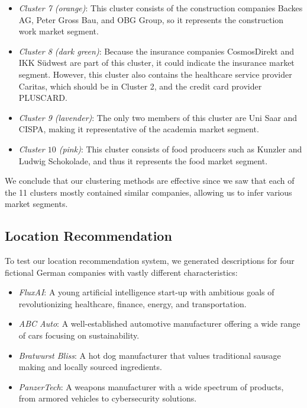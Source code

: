\documentclass[conference]{IEEEtran}
\begin{document}
\begin{itemize}
	\item \textit{Cluster 7 (orange)}: This cluster consists of the construction companies Backes AG, Peter Gross Bau, and OBG Group, so it represents the construction work market segment.
	
	\item \textit{Cluster 8 (dark green)}: Because the insurance companies CosmosDirekt and IKK Südwest are part of this cluster, it could indicate the insurance market segment. However, this cluster also contains the healthcare service provider Caritas, which should be in Cluster 2, and the credit card provider PLUSCARD.
	
	\item \textit{Cluster 9 (lavender)}: The only two members of this cluster are Uni Saar and CISPA, making it representative of the academia market segment.
	
	\item \textit{Cluster $10$ (pink)}: This cluster consists of food producers such as Kunzler and Ludwig Schokolade, and thus it represents the food market segment.
\end{itemize}
We conclude that our clustering methods are effective since we saw that each of the 11 clusters mostly contained similar companies, allowing us to infer various market segments.

\subsection{Location Recommendation}
To test our location recommendation system, we generated descriptions for four fictional German companies with vastly different characteristics:
\begin{itemize}
    \item \textit{FluxAI}: A young artificial intelligence start-up with ambitious goals of revolutionizing healthcare, finance, energy, and transportation.
    \item \textit{ABC Auto}: A well-established automotive manufacturer offering a wide range of cars focusing on sustainability.
    \item \textit{Bratwurst Bliss}: A hot dog manufacturer that values traditional sausage making and locally sourced ingredients.
    \item \textit{PanzerTech}: A weapons manufacturer with a wide spectrum of products, from armored vehicles to cybersecurity solutions.
\end{itemize}
\end{document}
